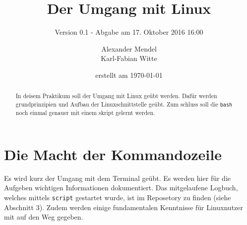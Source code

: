 \documentclass[
   draft=false
  ,paper=a4
  ,twoside=false
  ,fontsize=11pt
  ,headsepline
  ,BCOR10mm
  ,DIV11
]{scrartcl} %
\begin{document}
\titlehead{Betriebsysteme WS 2016 Praktikum 01 }%
\subject{BS Praktikumsaufgabe 01}%
\title{Der Umgang mit Linux}%
\subtitle{Version 0.1 - Abgabe am 17. Oktober 2016 16:00}%
\author{Alexander Mendel \\ Karl-Fabian Witte}%
\date{erstellt am \today}%
\maketitle%
\begin{abstract}
  In deisem Praktikum soll der Umgang mit Linux geübt werden.
  Dafür werden grundprinzipien und Aufbau der Linuxschnittstelle geübt.
  Zum schluss soll die \texttt{bash} noch einmal genauer mit einem skript
  gelernt werden.  \end{abstract}
\tableofcontents

\section{Die Macht der Kommandozeile}
Es wird kurz der Umgang mit dem Terminal geübt. Es werden hier für die
Aufgeben wichtigen Informationen dokumentiert. Das mitgelaufene Logbuch,
welches mittels \texttt{script} gestartet wurde, ist im Reposetory zu finden
(siehe Abschnitt 3). Zudem werden einige fundamentalen Kenntnisse für
Linuxnutzer mit auf den Weg gegeben.
\end{document}
